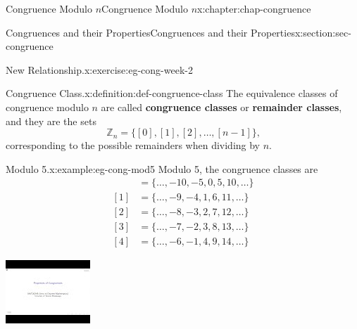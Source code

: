 \documentclass[oneside,10pt,]{book}
\newcommand{\terminology}[1]{\textbf{#1}}
\numberwithin{equation}{section}
\newlength{\qrsize}
\newlength{\previewwidth}
\newcommand{\amp}{&}
\begin{document}
\begin{chapterptx}{Congruence Modulo \(n\)}{}{Congruence Modulo \(n\)}{}{}{x:chapter:chap-congruence}
\begin{sectionptx}{Congruences and their Properties}{}{Congruences and their Properties}{}{}{x:section:sec-congruence}
\begin{inlineexercise}{New Relationship.}{x:exercise:eg-cong-week-2}
\end{inlineexercise}%
\begin{definition}{Congruence Class.}{x:definition:def-congruence-class}%
The equivalence classes of congruence modulo \(n\) are called \terminology{congruence classes} or \terminology{remainder classes}, and they are the sets%
\begin{equation*}
\mathbb{Z}_n = \{[0],[1],[2],\ldots,[n-1]\}\text{,}
\end{equation*}
corresponding to the possible remainders when dividing by \(n\). \label{g:notation:id535390}%
\end{definition}
\begin{example}{Modulo 5.}{x:example:eg-cong-mod5}%
Modulo 5, the congruence classes are%
\begin{align*}
[0] \amp = \{\ldots,-10,-5,0,5,10,\ldots\}\\
[1] \amp = \{\ldots,-9,-4,1,6,11,\ldots\}\\
[2] \amp = \{\ldots,-8,-3,2,7,12,\ldots\}\\
[3] \amp = \{\ldots,-7,-2,3,8,13,\ldots\}\\
[4] \amp = \{\ldots,-6,-1,4,9,14,\ldots\}
\end{align*}
%
\end{example}
\begin{sidebyside}{1}{0}{0}{0}%
\begin{sbspanel}{1}%
\setlength{\qrsize}{9em}
\setlength{\previewwidth}{\linewidth}
\addtolength{\previewwidth}{-\qrsize}
\begin{tcbraster}[raster columns=2, raster column skip=1pt, raster halign=center, raster force size=false, raster left skip=0pt, raster right skip=0pt]%
\begin{tcolorbox}[previewstyle, width=\previewwidth]%
\includegraphics[width=0.80\linewidth,height=\qrsize,keepaspectratio]{images/video-properties-of-congruence.jpg}%

\end{tcolorbox}
\end{tcbraster}
\end{sbspanel}
\end{sidebyside}
\end{sectionptx}
\end{chapterptx}
\end{document}
